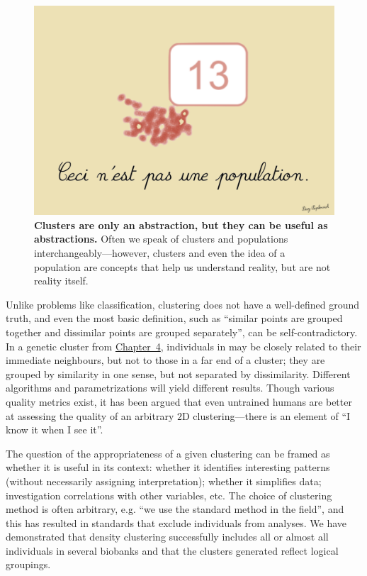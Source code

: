 \begin{figure}[h]
\centering
    \includegraphics[width=0.75\linewidth]{main_figures/discussion/magritte.png}
\caption[The treachery of clustering]{\textbf{Clusters are only an abstraction, but they can be useful as abstractions.} Often we speak of clusters and populations interchangeably---however, clusters and even the idea of a population are concepts that help us understand reality, but are not reality itself.}
\label{fig:magritte}
\end{figure}

Unlike problems like classification, clustering does not have a well-defined ground truth, and even the most basic definition, such as ``similar points are grouped together and dissimilar points are grouped separately'', can be self-contradictory\citep{ben-david_clustering_2018}. In a genetic cluster from \hyperref[chap:chapter4]{Chapter~4}, individuals in may be closely related to their immediate neighbours, but not to those in a far end of a cluster; they are grouped by similarity in one sense, but not separated by dissimilarity. Different algorithms and parametrizations will yield different results. Though various quality metrics exist, it has been argued that even untrained humans are better at assessing the quality of an arbitrary $2$D clustering\citep{lewis_human_2012}---there is an element of ``I know it when I see it''. 

The question of the appropriateness of a given clustering can be framed as whether it is useful in its context: whether it identifies interesting patterns (without necessarily assigning interpretation); whether it simplifies data; investigation correlations with other variables, etc\citep{hennig_what_2015}. The choice of clustering method is often arbitrary, e.g. ``we use the standard method in the field''\citep{ben-david_clustering_2018}, and this has resulted in standards that exclude individuals from analyses\citep{ding_polygenic_2023}. We have demonstrated that density clustering successfully includes all or almost all individuals in several biobanks and that the clusters generated reflect logical groupings.
\citep{hennig_what_2015}

